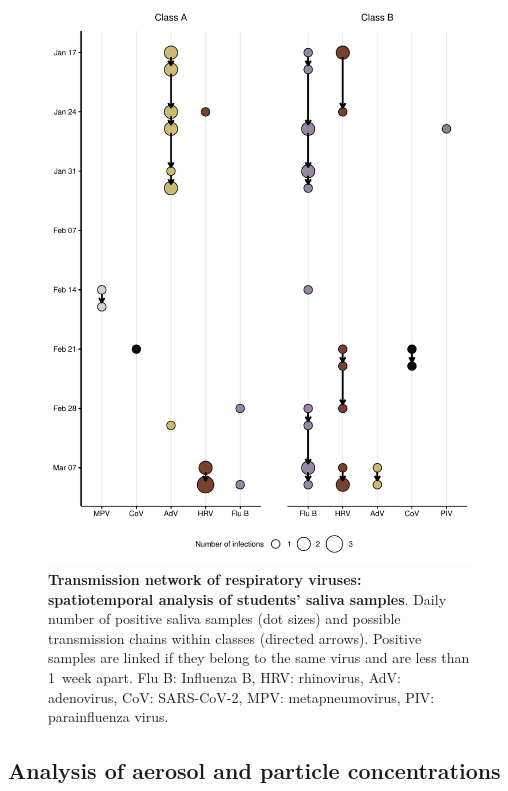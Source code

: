 \documentclass[fleqn,11pt]{wlscirep}
\begin{document}
\begin{figure}[!htpb]
    \centering
    \includegraphics{../../results/mol-data/network-plot.pdf}
    \caption{\textbf{Transmission network of respiratory viruses: spatiotemporal analysis of students' saliva samples}. Daily number of positive saliva samples (dot sizes) and possible transmission chains within classes (directed arrows). Positive samples are linked if they belong to the same virus and are less than 1~week apart. Flu B: Influenza B, HRV: rhinovirus, AdV: adenovirus, CoV: SARS-CoV-2, MPV: metapneumovirus, PIV: parainfluenza virus.}
    \label{fig:molecular-network}
\end{figure}

\subsection{Analysis of aerosol and particle concentrations}
\end{document}
